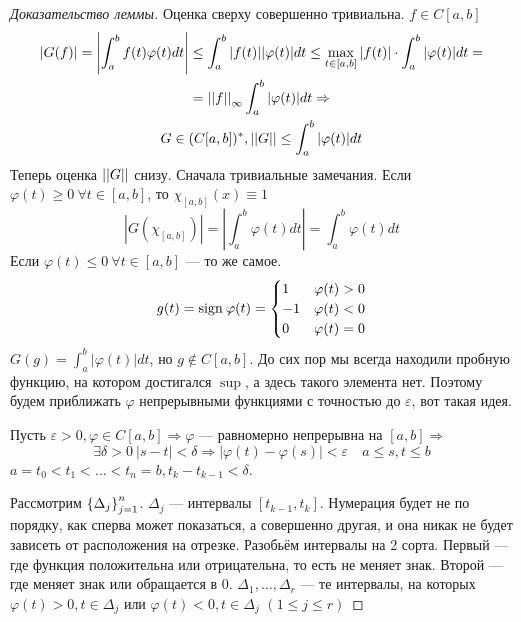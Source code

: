\documentclass[document]{subfiles}
\begin{document}
\begin{proof}[Доказательство леммы]
    Оценка сверху совершенно тривиальна.
    $f \in C[a,b]$
    \begin{multline*}
        |G(f)| = \left| \int^b_a f(t) \varphi(t) dt \right| \leq \int^b_a |f(t)| |\varphi(t)| dt \leq \max_{t \in [a,b]} |f(t)| \cdot \int^b_a |\varphi(t)| dt = \\ =
        \left|\left| {f} \right| \right|_\infty \int^b_a |\varphi(t)| dt \Rightarrow \\
        G \in (C[a,b])^*, \left|\left| {G} \right| \right| \leq \int^b_a |\varphi(t)| dt
    \end{multline*}
    Теперь оценка $\left|\left| {G} \right| \right|$ снизу. Сначала тривиальные замечания. Если $\varphi(t) \geq 0 \: \forall t \in [a,b]$, то $\chi_{[a,b]}(x) \equiv 1$
    \[ |G(\chi_{[a,b]})| = \left| \int^b_a \varphi(t) dt \right| = \int^b_a \varphi(t) dt \]
    Если $\varphi(t) \leq 0 \: \forall t \in [a,b]$ --- то же самое.
    \[ g(t) = \mathrm{sign} \: \varphi(t) = \begin{cases}
        1 & \varphi(t) > 0 \\
        -1 & \varphi(t) < 0 \\
        0 &\varphi(t) = 0
    \end{cases} \]
    $G(g) = \int^b_a |\varphi(t)| dt$, но $g \notin C[a,b]$.
    До сих пор мы всегда находили пробную функцию, на котором достигался $\sup$, а здесь такого элемента нет.
    Поэтому будем приближать $\varphi$ непрерывными функциями  с точностью до $\varepsilon$, вот такая идея. 

    Пусть $\varepsilon > 0, \varphi \in C[a,b] \Rightarrow \varphi$ --- равномерно непрерывна на $[a,b] \Rightarrow$
    \[ \exists \delta > 0 \: |s-t| < \delta \Rightarrow |\varphi(t) - \varphi(s)| < \varepsilon \quad a \leq s, t \leq b \]
    $a = t_0 < t_1 < \ldots < t_n = b, t_k - t_{k-1} < \delta$.

    Рассмотрим $\left\{\Delta_j\right\}^n_{j=1}$. $\Delta_j$ --- интервалы $[t_{k-1}, t_k]$.
    Нумерация будет не по порядку, как сперва может показаться, а совершенно другая, и она никак не будет зависеть от расположения на отрезке.
     Разобьём интервалы на 2 сорта. Первый --- где функция положительна или отрицательна, то есть не меняет знак. Второй --- где меняет знак или обращается в 0.
    $\Delta_1, \ldots, \Delta_r$ --- те интервалы, на которых $\varphi(t) > 0, t \in \Delta_j$ или $\varphi(t) < 0, t \in \Delta_j$ $(1 \leq j \leq r)$


\end{proof}
\end{document}
